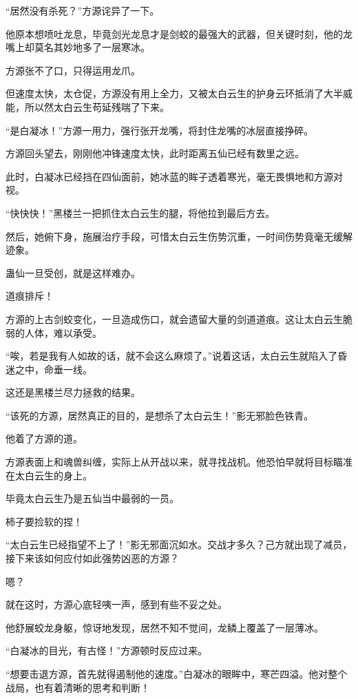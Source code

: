 \begin{this_body}
“居然没有杀死？”方源诧异了一下。

他原本想喷吐龙息，毕竟剑光龙息才是剑蛟的最强大的武器，但关键时刻，他的龙嘴上却莫名其妙地多了一层寒冰。

方源张不了口，只得运用龙爪。

但速度太快，太仓促，方源没有用上全力，又被太白云生的护身云环抵消了大半威能，所以然太白云生苟延残喘了下来。

“是白凝冰！”方源一用力，强行张开龙嘴，将封住龙嘴的冰层直接挣碎。

方源回头望去，刚刚他冲锋速度太快，此时距离五仙已经有数里之远。

此时，白凝冰已经挡在四仙面前，她冰蓝的眸子透着寒光，毫无畏惧地和方源对视。

“快快快！”黑楼兰一把抓住太白云生的腿，将他拉到最后方去。

然后，她俯下身，施展治疗手段，可惜太白云生伤势沉重，一时间伤势竟毫无缓解迹象。

蛊仙一旦受创，就是这样难办。

道痕排斥！

方源的上古剑蛟变化，一旦造成伤口，就会遗留大量的剑道道痕。这让太白云生脆弱的人体，难以承受。

“唉，若是我有人如故的话，就不会这么麻烦了。”说着这话，太白云生就陷入了昏迷之中，命垂一线。

这还是黑楼兰尽力拯救的结果。

“该死的方源，居然真正的目的，是想杀了太白云生！”影无邪脸色铁青。

他着了方源的道。

方源表面上和魂兽纠缠，实际上从开战以来，就寻找战机。他恐怕早就将目标瞄准在太白云生的身上。

毕竟太白云生乃是五仙当中最弱的一员。

柿子要捡软的捏！

“太白云生已经指望不上了！”影无邪面沉如水。交战才多久？己方就出现了减员，接下来该如何应付如此强势凶恶的方源？

嗯？

就在这时，方源心底轻咦一声，感到有些不妥之处。

他舒展蛟龙身躯，惊讶地发现，居然不知不觉间，龙鳞上覆盖了一层薄冰。

“白凝冰的目光，有古怪！”方源顿时反应过来。

“想要击退方源，首先就得遏制他的速度。”白凝冰的眼眸中，寒芒四溢。他对整个战局，也有着清晰的思考和判断！

\end{this_body}


